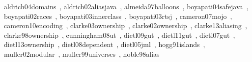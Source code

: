 \documentclass{acm_proc_article-sp}
\begin{document}
aldrich04domains~\cite{aldrich04domains},\newline
aldrich02aliasjava~\cite{aldrich02aliasjava},\newline
almeida97balloons~\cite{almeida97balloons},\newline
boyapati04safejava~\cite{boyapati04safejava},\newline
boyapati02races~\cite{boyapati02races},\newline
boyapati03innerclass~\cite{boyapati03innerclass},\newline
boyapati03rtsj~\cite{boyapati03rtsj},\newline
cameron07mojo~\cite{cameron07mojo},\newline
cameron10encoding~\cite{cameron10encoding},\newline
clarke03ownership~\cite{clarke03ownership},\newline
clarke02ownership~\cite{clarke02ownership},\newline
clarke13aliasing~\cite{clarke13aliasing},\newline
clarke98ownership~\cite{clarke98ownership},\newline
cunningham08ut~\cite{cunningham08ut},\newline
dietl09gut~\cite{dietl09gut},\newline
dietl11gut~\cite{dietl11gut},\newline
dietl07gut~\cite{dietl07gut},\newline
dietl13ownership~\cite{dietl13ownership},\newline
dietl08dependent~\cite{dietl08dependent},\newline
dietl05jml~\cite{dietl05jml},\newline
hogg91islands~\cite{hogg91islands},\newline
muller02modular~\cite{muller02modular},\newline
muller99universes~\cite{muller99universes},\newline
noble98alias~\cite{noble98alias}





\end{document}

